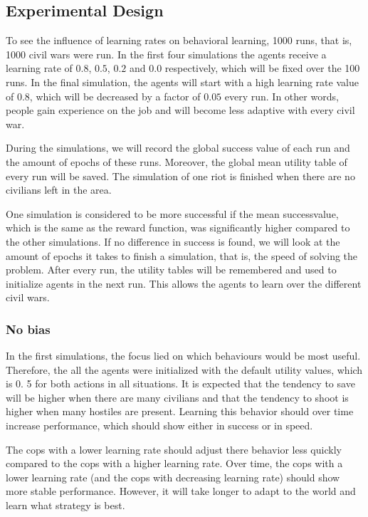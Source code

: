 \subsection{Experimental Design}
To see the influence of learning rates on behavioral learning, 1000 runs, that is, 1000 civil wars were run.
In the first four simulations the agents receive a learning rate of $0.
8$, $0.
5$, $0.
2$ and $0.
0$ respectively, which will be fixed over the 100 runs.
In the final simulation, the agents will start with a high learning rate value of $0.
8$, which will be decreased by a factor of $0.
05$ every run.
In other words, people gain experience on the job and will become less adaptive with every civil war.


During the simulations, we will record the global success value of each run and the amount of epochs of these runs.
Moreover, the global mean utility table of every run will be saved.
The simulation of one riot is finished when there are no civilians left in the area.


One simulation is considered to be more successful if the mean successvalue, which is the same as the reward function, was significantly higher compared to the other simulations.
If no difference in success is found, we will look at the amount of epochs it takes to finish a simulation, that is, the speed of solving the problem.
After every run, the utility tables will be remembered and used to initialize agents in the next run.
This allows the agents to learn over the different civil wars.


\subsubsection{No bias}
In the first simulations, the focus lied on which behaviours would be most useful.
Therefore, the all the agents were initialized with the default utility values, which is 0.
5 for both actions in all situations.
It is expected that the tendency to save will be higher when there are many civilians and that the tendency to shoot is higher when many hostiles are present.
Learning this behavior should over time increase performance, which should show either in success or in speed.


The cops with a lower learning rate should adjust there behavior less quickly compared to the cops with a higher learning rate.
Over time, the cops with a lower learning rate (and the cops with decreasing learning rate) should show more stable performance.
However, it will take longer to adapt to the world and learn what strategy is best.

